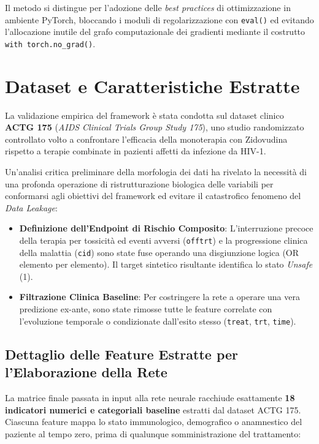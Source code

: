 \documentclass{article}
\begin{document}
Il metodo si distingue per l'adozione delle \textit{best practices} di ottimizzazione in ambiente PyTorch, bloccando i moduli di regolarizzazione con \texttt{eval()} ed evitando l'allocazione inutile del grafo computazionale dei gradienti mediante il costrutto \texttt{with torch.no\_grad()}.

\section{Dataset e Caratteristiche Estratte}
La validazione empirica del framework è stata condotta sul dataset clinico \textbf{ACTG 175} (\textit{AIDS Clinical Trials Group Study 175}), uno studio randomizzato controllato volto a confrontare l'efficacia della monoterapia con Zidovudina rispetto a terapie combinate in pazienti affetti da infezione da HIV-1.

Un'analisi critica preliminare della morfologia dei dati ha rivelato la necessità di una profonda operazione di ristrutturazione biologica delle variabili per conformarsi agli obiettivi del framework ed evitare il catastrofico fenomeno del \textit{Data Leakage}:
\begin{itemize}
    \item \textbf{Definizione dell'Endpoint di Rischio Composito}: L'interruzione precoce della terapia per tossicità ed eventi avversi (\texttt{offtrt}) e la progressione clinica della malattia (\texttt{cid}) sono state fuse operando una disgiunzione logica (OR elemento per elemento). Il target sintetico risultante identifica lo stato \textit{Unsafe} (1).
    \item \textbf{Filtrazione Clinica Baseline}: Per costringere la rete a operare una vera predizione ex-ante, sono state rimosse tutte le feature correlate con l'evoluzione temporale o condizionate dall'esito stesso (\texttt{treat}, \texttt{trt}, \texttt{time}).
\end{itemize}

\subsection{Dettaglio delle Feature Estratte per l'Elaborazione della Rete}
La matrice finale passata in input alla rete neurale racchiude esattamente \textbf{18 indicatori numerici e categoriali baseline} estratti dal dataset ACTG 175. Ciascuna feature mappa lo stato immunologico, demografico o anamnestico del paziente al tempo zero, prima di qualunque somministrazione del trattamento:
\end{document}
